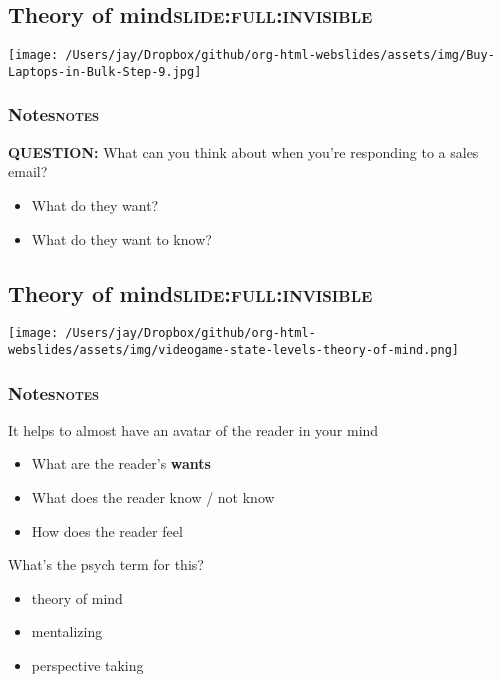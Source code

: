 \documentclass[11pt]{article}
\begin{document}
\subsection{Theory of mind\hfill{}\textsc{slide:full:invisible}}
\label{sec:org14d1bf5}
\begin{center}
\texttt{[image: /Users/jay/Dropbox/github/org-html-webslides/assets/img/Buy-Laptops-in-Bulk-Step-9.jpg]}
\end{center}

\subsubsection{Notes\hfill{}\textsc{notes}}
\label{sec:org885bc38}
\textbf{QUESTION:} What can you think about when you're responding to a sales email?

\begin{itemize}
\item What do they want?
\item What do they want to know?
\end{itemize}

\subsection{Theory of mind\hfill{}\textsc{slide:full:invisible}}
\label{sec:orgab3d6a6}
\begin{center}
\texttt{[image: /Users/jay/Dropbox/github/org-html-webslides/assets/img/videogame-state-levels-theory-of-mind.png]}
\end{center}

\subsubsection{Notes\hfill{}\textsc{notes}}
\label{sec:orgbc450bc}
It helps to almost have an avatar of the reader in your mind

\begin{itemize}
\item What are the reader's \textbf{wants}
\item What does the reader know / not know
\item How does the reader feel
\end{itemize}

What's the psych term for this?
\begin{itemize}
\item theory of mind
\item mentalizing
\item perspective taking
\end{itemize}
\end{document}
